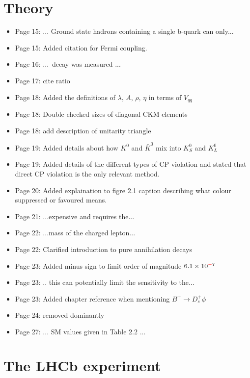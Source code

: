 \documentclass[12pt]{article}
\begin{document}
\section{Theory}
\begin{itemize}
\item Page 15: ... Ground state hadrons {\color{red}containing a single b-quark} can only...
\item Page 15: Added citation for Fermi coupling.
\item Page 16: ... decay {\color{red}was} measured ... 
\item Page 17: {\color{blue}cite ratio}
\item Page 18: Added the definitions of $\lambda$, $A$, $\rho$, $\eta$ in terms of $V_{qq}$
\item Page 18: Double checked sizes of diagonal CKM elements
\item Page 18: {\color{blue} add description of unitarity triangle}
\item Page 19: Added details about how $K^{0}$ and $\bar{K}^{0}$ mix into $K_{S}^{0}$ and $K_{L}^{0}$
\item Page 19: Added details of the different types of CP violation and stated that direct CP violation is the only relevant method.
\item Page 20: Added explaination to figre 2.1 caption describing what colour suppressed or favoured means.
\item Page 21: ...expensive {\color{red}and} requires the...
\item Page 22: ...mass {\color{red}of the} charged lepton...

\item Page 22: Clarified introduction to pure annihilation decays
\item Page 23: Added minus sign to limit order of magnitude $6.1\times10^{{\color{red}-}7}$
\item Page 23: .. this can {\color{red}potentially} limit the sensitivity {\color{red}to} the...
\item Page 23: Added chapter reference when mentioning $B^+ \rightarrow D^+_s \phi$
\item Page 24: removed {\color{red}dominantly}
\item Page 27: ... SM values given {\color{red}in Table 2.2} ...
\end{itemize}
\section{The LHCb experiment}
\end{document}
